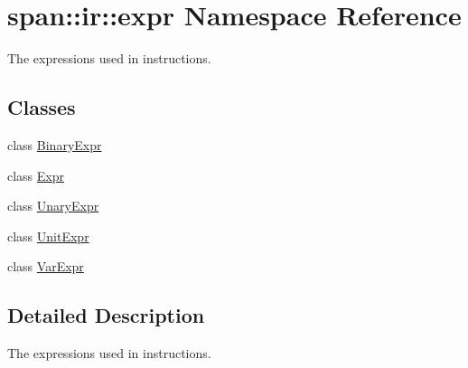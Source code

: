 \hypertarget{namespacespan_1_1ir_1_1expr}{}\section{span\+:\+:ir\+:\+:expr Namespace Reference}
\label{namespacespan_1_1ir_1_1expr}


The expressions used in instructions.  


\subsection*{Classes}
\begin{DoxyCompactItemize}
\item 
class \hyperlink{classspan_1_1ir_1_1expr_1_1BinaryExpr}{Binary\+Expr}
\item 
class \hyperlink{classspan_1_1ir_1_1expr_1_1Expr}{Expr}
\item 
class \hyperlink{classspan_1_1ir_1_1expr_1_1UnaryExpr}{Unary\+Expr}
\item 
class \hyperlink{classspan_1_1ir_1_1expr_1_1UnitExpr}{Unit\+Expr}
\item 
class \hyperlink{classspan_1_1ir_1_1expr_1_1VarExpr}{Var\+Expr}
\end{DoxyCompactItemize}


\subsection{Detailed Description}
The expressions used in instructions. 